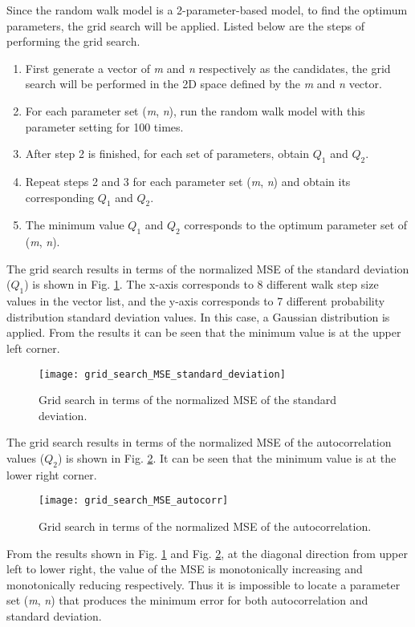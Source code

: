 \documentclass{umthesis}
\begin{document}
Since the random walk model is a 2-parameter-based model, to find the optimum parameters, the grid search will be applied. Listed below are the steps of performing the grid search. 

\begin{enumerate}
  \item First generate a vector of \textit{m} and \textit{n} respectively as the candidates, the grid search will be performed in the 2D space defined by the \textit{m} and \textit{n} vector.
  \item For each parameter set (\textit{m}, \textit{n}), run the random walk model with this parameter setting for 100 times.
  \item After step 2 is finished, for each set of parameters, obtain $Q_1$ and $Q_2$.
  \item Repeat steps 2 and 3 for each parameter set (\textit{m}, \textit{n}) and obtain its corresponding $Q_1$ and $Q_2$.
  \item The minimum value $Q_1$ and $Q_2$ corresponds to the optimum parameter set of (\textit{m}, \textit{n}).
\end{enumerate}

The grid search results in terms of the normalized MSE of the standard deviation ($Q_1$) is shown in Fig. \ref{fig:gridSeachSD}. The x-axis corresponds to 8 different walk step size values in the vector list, and the y-axis corresponds to 7 different probability distribution standard deviation values. In this case, a Gaussian distribution is applied. From the results it can be seen that the minimum value is at the upper left corner.

\begin{figure}
  \centering
  \texttt{[image: grid\_search\_MSE\_standard\_deviation]}
  \caption{Grid search in terms of the normalized MSE of the standard deviation.}\label{fig:gridSeachSD}
\end{figure}

The grid search results in terms of the normalized MSE of the autocorrelation values ($Q_2$) is shown in Fig. \ref{fig:gridSeachAC}. It can be seen that the minimum value is at the lower right corner. 

\begin{figure}
  \centering
  \texttt{[image: grid\_search\_MSE\_autocorr]}
  \caption{Grid search in terms of the normalized MSE of the autocorrelation.}\label{fig:gridSeachAC}
\end{figure}

From the results shown in Fig. \ref{fig:gridSeachSD} and Fig. \ref{fig:gridSeachAC}, at the diagonal direction from upper left to lower right, the value of the MSE is monotonically increasing and monotonically reducing respectively. Thus it is impossible to locate a parameter set (\textit{m}, \textit{n}) that produces the minimum error for both autocorrelation and standard deviation.
\end{document}
